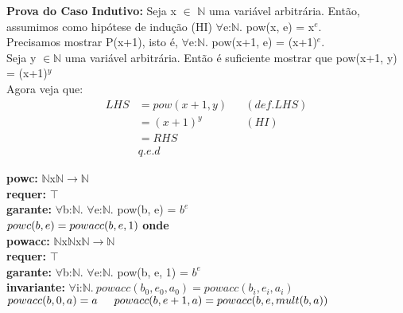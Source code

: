 \documentclass{article}
\begin{document}
\noindent \textbf{Prova do Caso Indutivo:} Seja x $\in$ $\mathbb{N}$ uma variável arbitrária. Então, assumimos como hipótese de indução (HI)
$\forall$e:$\mathbb{N}$. pow(x, e) = x$^e$.\\
Precisamos mostrar P(x+1), isto é, $\forall$e:$\mathbb{N}$. pow(x+1, e) = (x+1)$^e$.\\
Seja y $\in \mathbb{N}$ uma variável arbitrária. Então é suficiente mostrar que pow(x+1, y) = (x+1)$^y$\\
Agora veja que:
\begin{align*}
LHS &= pow(x+1, y) && (def. LHS)\\
&= (x+1)^y && (HI)\\
&= RHS \\
& q.e.d
\end{align*}

\noindent \textbf{powc:} $\mathbb{N}$x$\mathbb{N}$$ \rightarrow \mathbb{N}$\\
\textbf{requer:} $\top$\\
\textbf{garante:} $\forall$b:$\mathbb{N}$. $\forall$e:$\mathbb{N}$. pow(b, e) = $b^e$\\
$powc(b, e) = powacc(b, e, 1)\\$
\textbf{onde}\\
\indent \textbf{powacc:} $\mathbb{N}$x$\mathbb{N}$x$\mathbb{N}$$ \rightarrow \mathbb{N}$\\
\indent \textbf{requer:} $\top$\\
\indent \textbf{garante:} $\forall$b:$\mathbb{N}$. $\forall$e:$\mathbb{N}$. pow(b, e, 1) = $b^e$\\
\indent \textbf{invariante:} $\forall$i:$\mathbb{N}.\: powacc(b_0,e_0, a_0) = powacc(b_i, e_i, a_i)$\\
\indent $powacc(b, 0, a) = a\\
\indent powacc(b, e+1, a) = powacc(b, e, mult(b, a))\\$
\end{document}
